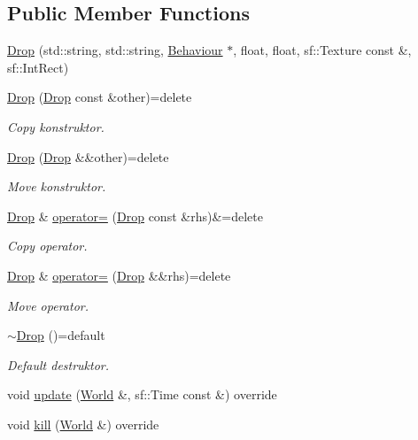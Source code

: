 \subsection*{Public Member Functions}
\begin{DoxyCompactItemize}
\item 
\hyperlink{classDrop_a6c26092306a5b47e85bea5db13598e8f}{Drop} (std\+::string, std\+::string, \hyperlink{classBehaviour}{Behaviour} $\ast$, float, float, sf\+::\+Texture const \&, sf\+::\+Int\+Rect)
\item 
\hyperlink{classDrop_ae8d6c72867091cf06b1cc90bd1de1d33}{Drop} (\hyperlink{classDrop}{Drop} const \&other)=delete
\begin{DoxyCompactList}\small\item\em Copy konstruktor. \end{DoxyCompactList}\item 
\hyperlink{classDrop_a073b0384031727ed673f45b8cf9d7a9c}{Drop} (\hyperlink{classDrop}{Drop} \&\&other)=delete
\begin{DoxyCompactList}\small\item\em Move konstruktor. \end{DoxyCompactList}\item 
\hyperlink{classDrop}{Drop} \& \hyperlink{classDrop_a9750d2b430032b1468242fdc59e9f3b4}{operator=} (\hyperlink{classDrop}{Drop} const \&rhs)\&=delete
\begin{DoxyCompactList}\small\item\em Copy operator. \end{DoxyCompactList}\item 
\hyperlink{classDrop}{Drop} \& \hyperlink{classDrop_a033da302213213df357084484b540006}{operator=} (\hyperlink{classDrop}{Drop} \&\&rhs)=delete
\begin{DoxyCompactList}\small\item\em Move operator. \end{DoxyCompactList}\item 
\hyperlink{classDrop_aaa217fe569287d8c9aa27745d545ab87}{$\sim$\+Drop} ()=default
\begin{DoxyCompactList}\small\item\em Default destruktor. \end{DoxyCompactList}\item 
void \hyperlink{classDrop_aa899493774d2a66cbb51f3cd9a0cf80e}{update} (\hyperlink{classWorld}{World} \&, sf\+::\+Time const \&) override
\item 
void \hyperlink{classDrop_a8bbd94b3140a246297aaf4c984dad4ee}{kill} (\hyperlink{classWorld}{World} \&) override

\end{DoxyCompactItemize}
